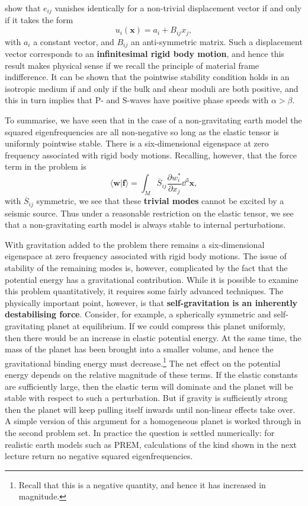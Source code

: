 show that $e_{ij}$ vanishes identically for a non-trivial displacement vector if and only if it takes the form
\begin{equation}
u_{i}(\mathbf{x})=a_{i}+B_{ij}x_{j},
\label{eq:43}
\end{equation}
with $a_{i}$ a constant vector, and $B_{ij}$ an anti-symmetric matrix. Such a displacement vector corresponds to an \textbf{infinitesimal 
rigid body motion}, and hence this result makes physical sense if we recall the principle of material frame indifference. It can be shown 
that the pointwise stability condition holds in an isotropic medium if and only if the bulk and shear moduli are both positive, and this in turn 
implies that P- and S-waves have positive phase speeds with $\alpha>\beta$. 

To summarise, we have seen that in the case of a non-gravitating earth model the squared eigenfrequencies are all non-negative so
 long as the elastic tensor is uniformly pointwise stable. There is a six-dimensional eigenspace at zero frequency associated with rigid body motions.
  Recalling, however, that the force term in the problem is
\begin{equation}
\langle \mathbf{w}|\mathbf{f}\rangle=\int_{M}\overline{S}_{ij}\frac{\partial w_{i}^{*}}{\partial x_{j}}\dd^{3}\mathbf{x},
\label{eq:44}
\end{equation}
with $\overline{S}_{ij}$ symmetric, we see that these \textbf{trivial modes} cannot be excited by a seismic source. Thus under a reasonable restriction on 
the elastic tensor, we see that a non-gravitating earth model is always stable to internal perturbations.

With gravitation added to the problem there remains a six-dimensional eigenspace at zero frequency associated with rigid body motions. 
The issue of stability of the remaining modes is, however, complicated by the fact that the potential energy has a gravitational contribution.
While it is possible to examine this problem quantitatively, it requires some fairly advanced techniques. The physically important point, however,
is that \textbf{self-gravitation is an inherently destabilising force}. Consider, for example, a spherically symmetric and self-gravitating planet 
at equilibrium. If we could compress this planet uniformly, then there would be an increase in elastic potential energy. At the same time, the mass 
of the planet has been brought into a smaller volume, and hence the gravitational binding energy must decrease.\footnote{Recall that this is a negative
quantity, and hence it has increased in magnitude.} The net effect on the potential energy depends on the relative magnitude of these terms. 
If the elastic constants are sufficiently large, then the elastic term will dominate and the planet will be stable with respect to such a perturbation. 
But if gravity is sufficiently strong then the planet will keep pulling itself inwards until non-linear effects take over.
A simple version of this argument for a homogeneous planet is worked through in the second problem set. In practice the question
is settled numerically: for realistic earth models such as PREM, calculations of the kind shown in the next lecture return no
negative squared eigenfrequencies.


